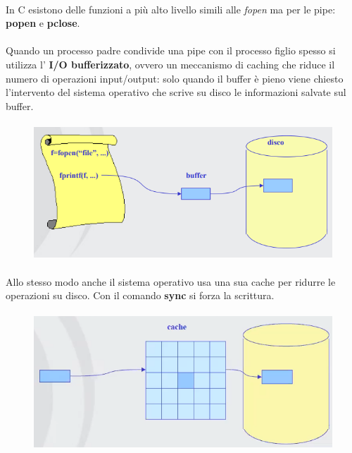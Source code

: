 \paragraph*{}
In C esistono delle funzioni a più alto livello simili alle \textit{fopen} ma per le pipe: \textbf{popen} e \textbf{pclose}.

\paragraph*{}
Quando un processo padre condivide una pipe con il processo figlio spesso si utilizza l' \textbf{I/O bufferizzato}, ovvero un meccanismo di caching che riduce il numero di operazioni input/output: solo quando il buffer è pieno viene chiesto l'intervento del sistema operativo che scrive su disco le informazioni salvate sul buffer.


\paragraph*{}
\paragraph*{}
\begin{figure}[H]
    \centering
    \includegraphics[width=0.6\linewidth]{assets/buffer8.png}
\end{figure}

\paragraph*{}
Allo stesso modo anche il sistema operativo usa una sua cache per ridurre le operazioni su disco. Con il comando \textbf{sync} si forza la scrittura.


\paragraph*{}
\paragraph*{}
\begin{figure}[H]
    \centering
    \includegraphics[width=0.6\linewidth]{assets/cache8.png}
\end{figure}
